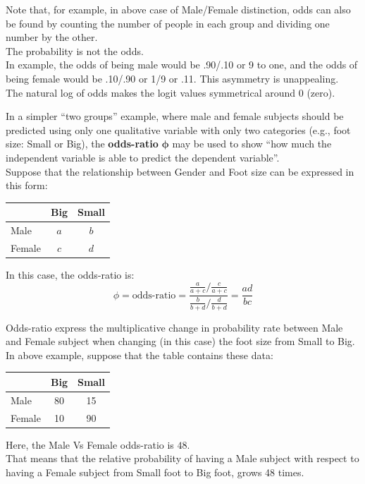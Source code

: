 \begin{frame}
  \vspace{.25cm}
  Note that, for example, in above case of Male/Female distinction, odds can also be found by counting the number of people in each group and dividing one number by the other. \\
  \vspace{.5cm}
  The probability is not the odds. \\
  \vspace{.5cm}
  In example, the odds of being male would be .90/.10 or 9 to one, and the odds of being female would be .10/.90 or 1/9 or .11. This asymmetry is unappealing.\\
  \vspace{.5cm}
  The natural log of odds makes the logit values symmetrical around 0 (zero).\\
\end{frame}

\begin{frame}
  \vspace{.25cm}
  In a simpler ``two groups'' example, where male and female subjects should be predicted using only one qualitative variable with only two categories (e.g., foot size: Small or Big), the \textbf{odds-ratio} $\mathbf{\phi}$ may be used to show ``how much the independent variable is able to predict the dependent variable''.\\
  Suppose that the relationship between Gender and Foot size can be expressed in this form:
  \begin{center}
    \begin{tabular}{l|c|c}
      & Big & Small\\
      \hline
      Male & $a$ & $b$\\
      \hline
      Female & $c$ & $d$
    \end{tabular}
  \end{center}
  In this case, the odds-ratio is:\\
  $$\phi=\text{odds-ratio}=\dfrac{\frac{a}{a+c}/\frac{c}{a+c}}{\frac{b}{b+d}/\frac{d}{b+d}}=\dfrac{a d}{b c}$$
\end{frame}

\begin{frame}
  \vspace{.25cm}
  Odds-ratio express the multiplicative change in probability rate between Male and Female subject when changing (in this case) the foot size from Small to Big.
  In above example, suppose that the table contains these data:
  \begin{center}
    \begin{tabular}{l|c|c}
      & Big & Small\\
      \hline
      Male & 80 & 15\\
      \hline
      Female & 10 & 90
    \end{tabular}
  \end{center}
  Here, the Male Vs Female odds-ratio is $48$.\\
  \vspace{.25cm}
  That means that the relative probability of having a Male subject with respect to having a Female subject from Small foot to Big foot, grows 48 times.
\end{frame}


